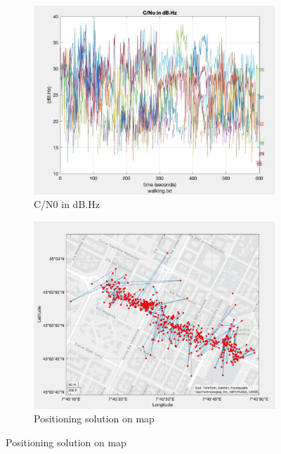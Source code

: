 \begin{figure}[H]
  \begin{subfigure}{.22\textwidth}
  \centering
    \includegraphics[width=1\linewidth]{images/walking_figure_3.pdf}
    \caption{C/N0 in dB.Hz}
    \label{fig:walking_figure_3.pdf}
  \end{subfigure}
  \begin{subfigure}{.22\textwidth}
  \centering
    \includegraphics[width=1\linewidth]{images/walking_figure_6.pdf}
    \caption{Positioning solution on map}
    \label{fig:walking_figure_6}
  \end{subfigure}
  \vspace{10pt}
\end{figure}

